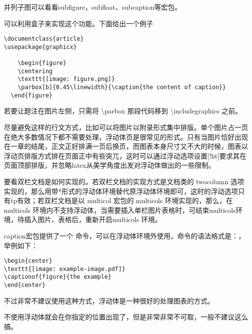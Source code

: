 
并列子图可以看看subfigure，subfloat、subcaption等宏包。



可以利用盒子来实现这个功能。下面给出一个例子

\begin{verbatim}
\documentclass{article}
\usepackage{graphicx}

    \begin{figure}
    \centering
    \texttt{[image: figure.png]}
    \parbox[b]{0.45\linewidth}{\caption{the content of caption}}
  \end{figure}

\end{verbatim}

若要让题注在图片左侧，只需将 \textbackslash{}parbox 那段代码移到
\textbackslash{}includegraphics 之前。



尽量避免这样的行文方式，比如可以将图片以附录形式集中排版。单个图片占一页在绝大多数情况下都不需要处理，浮动体页是很常见的形式。只有当图片恰好出现在一章的结尾，正文正好排满一页后换页，而图表本身尺寸又不大的时候，图表以浮动页排版方式排在页面正中有些突兀，这时可以通过浮动选项设置{[}!ht{]}要求其在页面顶部排版，并忽略latex从美学角度出发对浮动体做出的一些限制。



要看双栏文档是如何实现的。若双栏文档的实现方式是文档类的 twocolumn
选项实现的，那么用带*形式的浮动体环境替代原浮动体环境即可，这时的浮动选项只有tp有效；若双栏文档是以
multicol 宏包的 multicols 环境实现的，那么，在 multicols
环境内不支持浮动体，当需要插入单栏图片表格时，可结束multicols环境，待插入图片、表格后，重新开启multicols
环境。



caption宏包提供了一个
命令，可以在浮动体环境外使用，命令的语法格式是：，举例如下：

\begin{verbatim}
\begin{center}
\texttt{[image: example-image.pdf]}
\captionof{figure}{the example}
\end{center}
\end{verbatim}

不过非常不建议使用这种方式，浮动体是一种很好的处理图表的方式。



不使用浮动体就会在你指定的位置出现了，但是非常非常不可取，一般不建议这么搞。






